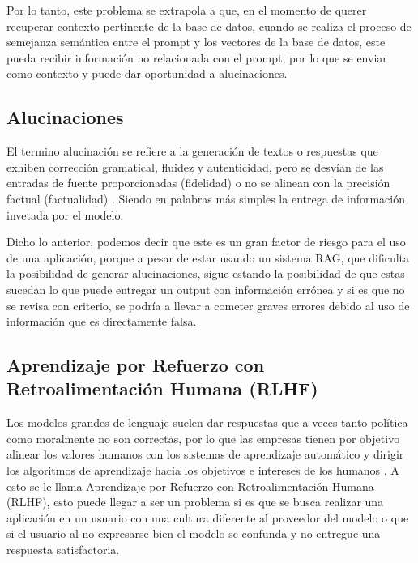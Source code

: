 Por lo tanto, este problema se extrapola a que, en el momento de querer recuperar contexto pertinente de la base de datos, 
cuando se realiza el proceso de semejanza semántica entre el prompt y los vectores de la base de datos, este pueda recibir 
información no relacionada con el prompt, por lo que se enviar como contexto y puede dar oportunidad a alucinaciones.


\subsection{Alucinaciones}

El termino alucinación se refiere a la generación de textos o respuestas que exhiben corrección gramatical, fluidez y autenticidad,
pero se desvían de las entradas de fuente proporcionadas (fidelidad) o no se alinean con la precisión factual (factualidad) \cite{alucionacion1}.
Siendo en palabras más simples la entrega de información invetada por el modelo.

Dicho lo anterior, podemos decir que este es un gran factor de riesgo para el uso de una aplicación, porque a pesar de estar usando un 
sistema RAG, que dificulta la posibilidad de generar alucinaciones, sigue estando la posibilidad de que estas sucedan lo que puede 
entregar un output con información errónea y si es que no se revisa con criterio, se podría a llevar a cometer graves errores debido 
al uso de información que es directamente falsa.

\subsection{Aprendizaje por Refuerzo con Retroalimentación Humana (RLHF)}

Los modelos grandes de lenguaje suelen dar respuestas que a veces tanto política como moralmente no son correctas, por lo que 
las empresas tienen por objetivo alinear los valores humanos con los sistemas de aprendizaje automático y dirigir los algoritmos 
de aprendizaje hacia los objetivos e intereses de los humanos \cite{RLHF}. A esto se le llama Aprendizaje por Refuerzo con 
Retroalimentación Humana (RLHF), esto puede llegar a ser un problema si es que se busca realizar una aplicación en un usuario con una 
cultura diferente al proveedor del modelo o que si el usuario al no expresarse bien el modelo se confunda y no entregue una respuesta 
satisfactoria.





